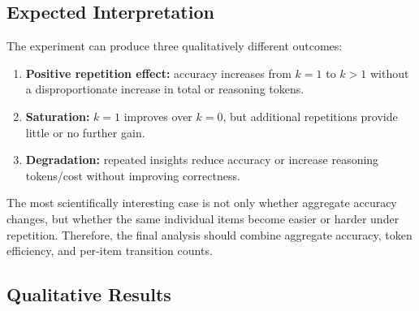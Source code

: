 \subsection{Expected Interpretation}

The experiment can produce three qualitatively different outcomes:

\begin{enumerate}
    \item \textbf{Positive repetition effect:} accuracy increases from $k=1$ to $k>1$ without a disproportionate increase in total or reasoning tokens.
    \item \textbf{Saturation:} $k=1$ improves over $k=0$, but additional repetitions provide little or no further gain.
    \item \textbf{Degradation:} repeated insights reduce accuracy or increase reasoning tokens/cost without improving correctness.
\end{enumerate}

The most scientifically interesting case is not only whether aggregate accuracy changes, but whether the same individual items become easier or harder under repetition. Therefore, the final analysis should combine aggregate accuracy, token efficiency, and per-item transition counts.



\subsection{Qualitative Results}
\label{subsec:qualitative}

